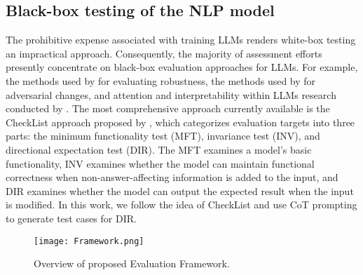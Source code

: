 \documentclass[runningheads]{llncs}
\begin{document}
\subsection{Black-box testing of the NLP model}
The prohibitive expense associated with training LLMs renders white-box testing an impractical approach. Consequently, the majority of assessment efforts presently concentrate on black-box evaluation approaches for LLMs. For example, the methods used by \cite{belinkov2019analysis,rychalska2019models} for evaluating robustness, the methods used by \cite{wu2019errudite} for adversarial changes, and attention and interpretability within LLMs research conducted by \cite{wang2019superglue}. The most comprehensive approach currently available is the CheckList approach proposed by \cite{ribeiro2020beyond}, which categorizes evaluation targets into three parts: the minimum functionality test (MFT), invariance test (INV), and directional expectation test (DIR). The MFT examines a model’s basic functionality, INV examines whether the model can maintain functional correctness when non-answer-affecting information is added to the input, and DIR examines whether the model can output the expected result when the input is modified. In this work, we follow the idea of CheckList and use CoT prompting to generate test cases for DIR.

\begin{figure}[t]\centering
\texttt{[image: Framework.png]}
\caption{Overview of proposed Evaluation Framework.} \label{fig1}
\end{figure}
\end{document}
